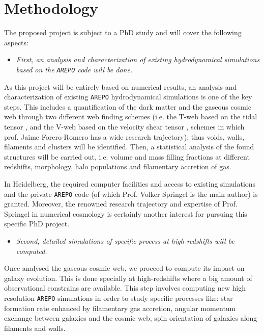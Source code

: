 \documentclass[a4,useAMS,usenatbib,usegraphicx,12pt]{article}
\begin{document}
\section{Methodology}


The proposed project is subject to a PhD study and will cover the following 
aspects:


\begin{itemize}

\item[\checkmark] \textit{First, an analysis and characterization of existing 
hydrodynamical simulations based on the \texttt{AREPO} code will be done.}

\end{itemize}


As this project will be entirely based on numerical results, an analysis and 
characterization of existing \texttt{AREPO} hydrodynamical simulations is one 
of the key steps. This includes a quantification of the dark matter and the 
gaseous cosmic web through two different web finding schemes (i.e. the T-web 
based on the tidal tensor \citep{Hahn07,Forero09}, and the V-web based on the 
velocity shear tensor \citep{Hoffman12}, schemes in which prof. Jaime 
Forero-Romero has a wide research trajectory); thus voids, walls, filaments 
and clusters will be identified. Then, a statistical analysis of the found 
structures will be carried out, i.e. volume and mass filling fractions at 
different redshifts, morphology, halo populations and filamentary accretion of 
gas.


In Heidelberg, the required computer facilities and access to existing 
simulations and the private \texttt{AREPO} code (of which Prof. Volker 
Springel is the main author) is granted. Moreover, the renowned research 
trajectory and expertise of Prof. Springel in numerical cosmology is 
certainly another interest for pursuing this specific PhD project.


\begin{itemize}

\item[\checkmark] \textit{Second, detailed simulations of specific process at
high redshifts will be computed.}

\end{itemize}


Once analysed the gaseous cosmic web, we proceed to compute its impact on 
galaxy evolution. This is done specially at high-redshifts where a big amount 
of observational constrains are available. This step involves computing new 
high resolution \texttt{AREPO} simulations in order to study specific processes
like: star formation rate enhanced by filamentary gas accretion, angular 
momentum exchange between galaxies and the cosmic web, spin orientation of 
galaxies along filaments and walls.
\end{document}
